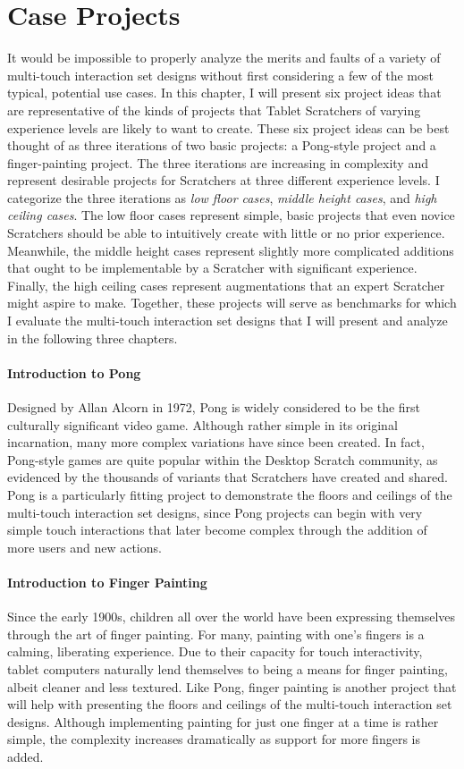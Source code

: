 \chapter{Case Projects}
It would be impossible to properly analyze the merits and faults of a variety of multi-touch interaction set designs without first considering a few of the most typical, potential use cases. In this chapter, I will present six project ideas that are representative of the kinds of projects that Tablet Scratchers of varying experience levels are likely to want to create. These six project ideas can be best thought of as three iterations of two basic projects: a Pong-style project and a finger-painting project. The three iterations are increasing in complexity and represent desirable projects for Scratchers at three different experience levels. I categorize the three iterations as \emph{low floor cases}, \emph{middle height cases}, and \emph{high ceiling cases}. The low floor cases represent simple, basic projects that even novice Scratchers should be able to intuitively create with little or no prior experience. Meanwhile, the middle height cases represent slightly more complicated additions that ought to be implementable by a Scratcher with significant experience. Finally, the high ceiling cases represent augmentations that an expert Scratcher might aspire to make. Together, these projects will serve as benchmarks for which I evaluate the multi-touch interaction set designs that I will present and analyze in the following three chapters.

\subsubsection{Introduction to Pong}
Designed by Allan Alcorn in 1972, Pong is widely considered to be the first culturally significant video game. Although rather simple in its original incarnation, many more complex variations have since been created.  In fact, Pong-style games are quite popular within the Desktop Scratch community, as evidenced by the thousands of variants that Scratchers have created and shared. Pong is a particularly fitting project to demonstrate the floors and ceilings of the multi-touch interaction set designs, since Pong projects can begin with very simple touch interactions that later become complex through the addition of more users and new actions.

\subsubsection{Introduction to Finger Painting}
Since the early 1900s, children all over the world have been expressing themselves through the art of finger painting. For many, painting with one's fingers is a calming, liberating experience. Due to their capacity for touch interactivity, tablet computers naturally lend themselves to being a means for finger painting, albeit cleaner and less textured. Like Pong, finger painting is another project that will help with presenting the floors and ceilings of the multi-touch interaction set designs. Although implementing painting for just one finger at a time is rather simple, the complexity increases dramatically as support for more fingers is added.

